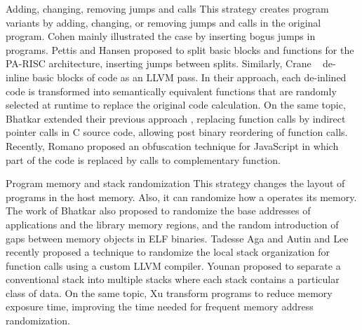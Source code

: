 \begin{strategy}{Adding, changing, removing jumps and calls}
    \label{strategy:S3}
    \normalfont
    This strategy creates program variants by adding, changing, or removing jumps and calls in the original program. Cohen \cite{cohen1993operating} mainly illustrated the case by inserting bogus jumps in programs. Pettis and Hansen \cite{pettisochhansen} proposed to split basic blocks and functions for the PA-RISC architecture, inserting jumps between splits.
    Similarly, Crane \etal~\cite{crane2015thwarting} de-inline basic blocks of code as an LLVM pass. In their approach, each de-inlined code is transformed into semantically equivalent functions that are randomly selected at runtime to replace the original code calculation. On the same topic, Bhatkar \etal \cite{bhatkar2005efficient} extended their previous approach \cite{bhatkar03}, replacing function calls by indirect pointer calls in C source code, allowing post binary reordering of function calls. Recently, Romano \etal \cite{wobfuscator} proposed an obfuscation technique for JavaScript in which part of the code is replaced by calls to complementary function.
\end{strategy}


\begin{strategy}{Program memory and stack randomization}
    \label{strategy:S4}
    \normalfont
    This strategy changes the layout of programs in the host memory. Also, it can randomize how a operates its memory. The work of Bhatkar \etal \cite{bhatkar03, bhatkar2005efficient} also proposed to randomize the base addresses of applications and the library memory regions, and the random introduction of gaps between memory objects in ELF binaries. Tadesse Aga and Autin \cite{aga2019smokestack} and Lee \etal \cite{lee2021savior} recently proposed a technique to randomize the local stack organization for function calls using a custom LLVM compiler.
    Younan \etal \cite{Younan2006} proposed to separate a conventional stack into multiple stacks where each stack contains a particular class of
    data. 
    On the same topic, Xu \etal \cite{xu2020merr} transform programs to reduce memory exposure time, improving the time needed for frequent memory address randomization. 
\end{strategy}


